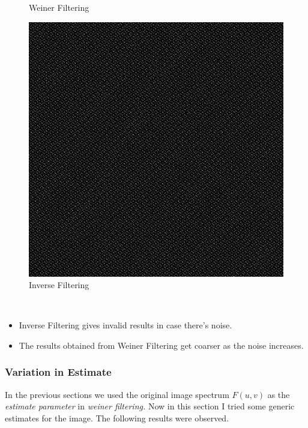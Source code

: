 \documentclass{article}
\begin{document}
\begin{figure}[!htb]
      \caption{Weiner Filtering}
    \endminipage\hfill
      \includegraphics[scale=.28]{./deblurring/0_1/inverse.png}
      \caption{Inverse Filtering}
    \endminipage
    \end{figure}\\[5pt]
    \begin{itemize}
        \item Inverse Filtering gives invalid results in case there's noise.
        \item The results obtained from Weiner Filtering get coarser as the noise increases.
    \end{itemize}
    \pagebreak


    
    \subsubsection*{Variation in Estimate}
    In the previous sections we used the original image spectrum \(F(u,v)\) as the \textit{estimate parameter} in \textit{weiner filtering.} Now in this section I tried some generic estimates for the image. The following results were observed.
\end{document}
